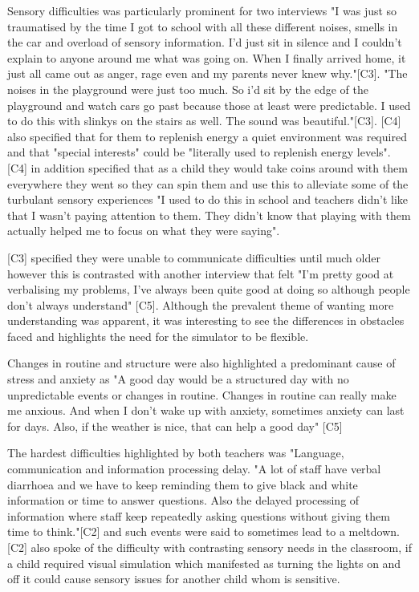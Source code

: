Sensory difficulties was particularly prominent for two interviews "I was just so traumatised by the time I got to school with all these different noises, smells in the car and overload of sensory information. I'd just sit in silence and I couldn’t explain to anyone around me what was going on. When I finally arrived home, it just all came out as anger, rage even and my parents never knew why."[C3]. "The noises in the playground were just too much. So i'd sit by the edge of the playground and watch cars go past because those at least were predictable. I used to do this with slinkys on the stairs as well. The sound was beautiful."[C3]. [C4] also specified that for them to replenish energy a quiet environment was required and that "special interests" could be "literally used to replenish energy levels". [C4] in addition specified that as a child they would take coins around with them everywhere they went so they can spin them and use this to alleviate some of the turbulant sensory experiences "I used to do this in school and teachers didn't like that I wasn't paying attention to them. They didn't know that playing with them actually helped me to focus on what they were saying".

[C3] specified they were unable to communicate difficulties until much older however this is contrasted with another interview that felt "I'm pretty good at verbalising my problems, I've always been quite good at doing so although people don't always understand" [C5]. Although the prevalent theme of wanting more understanding was apparent, it was interesting to see the differences in obstacles faced and highlights the need for the simulator to be flexible. 

Changes in routine and structure were also highlighted a predominant cause of stress and anxiety as "A good day would be a structured day with no unpredictable events or changes in routine. Changes in routine can really make me anxious. And when I don't wake up with anxiety, sometimes anxiety can last for days. Also, if the weather is nice, that can help a good day" [C5]

The hardest difficulties highlighted by both teachers was "Language, communication and information processing delay. "A lot of staff have verbal diarrhoea and we have to keep reminding them to give black and white information or time to answer questions. Also the delayed processing of information where staff keep repeatedly asking questions without giving them time to think."[C2] and such events were said to sometimes lead to a meltdown. [C2] also spoke of the difficulty with contrasting sensory needs in the classroom, if a child required visual simulation which manifested as turning the lights on and off it could cause sensory issues for another child whom is sensitive. 


